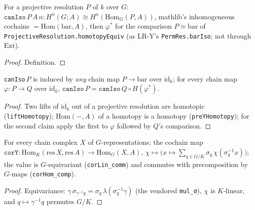 \begin{definition}\label{def:m6-can}
  \leanok
  For a projective resolution $P$ of $k$ over $G$: $\texttt{canIso}\,P\,A\,n\colon H^n(G;A)\cong H^n(\mathrm{Hom}_G(P,A))$, mathlib's
  inhomogeneous cochains $=\mathrm{Hom}(\mathrm{bar},A)$, then $\varphi^*$ for the comparison $P\simeq\mathrm{bar}$ of
  \texttt{ProjectiveResolution.homotopyEquiv} (as LR-Y's \texttt{PermRes.barIso}; not through $\mathrm{Ext}$).
\end{definition}
\begin{proof}
  \leanok
  Definition.
\end{proof}

\begin{lemma}\label{lem:m6-can-lift}
  \leanok
  \texttt{canIso}\,$P$ is induced by \emph{any} chain map $P\to\mathrm{bar}$ over $\mathrm{id}_k$; for every chain map
  $\varphi\colon P\to Q$ over $\mathrm{id}_k$, $\texttt{canIso}\,P=\texttt{canIso}\,Q\circ H(\varphi^*)$.
\end{lemma}
\begin{proof}
  \leanok
  Two lifts of $\mathrm{id}_k$ out of a projective resolution are homotopic (\texttt{liftHomotopy}); $\mathrm{Hom}(-,A)$ of a homotopy
  is a homotopy (\texttt{preYHomotopy}); for the second claim apply the first to $\varphi$ followed by $Q$'s comparison.
\end{proof}

\begin{definition}\label{def:m6-corY}
  \leanok
  For every chain complex $X$ of $G$-representations: the cochain map $\texttt{corY}\colon\mathrm{Hom}_K(\mathrm{res}\,X,\mathrm{res}\,A)\to
  \mathrm{Hom}_G(X,A)$, $\chi\mapsto\bigl(x\mapsto\sum_{q\in G/K}\sigma_q\,\chi(\sigma_q^{-1}x)\bigr)$; the value is $G$-equivariant
  (\texttt{corLin\_comm}) and commutes with precomposition by $G$-maps (\texttt{corHom\_comp}).
\end{definition}
\begin{proof}
  \leanok
  Equivariance: $\gamma\,\sigma_{\gamma^{-1}q}=\sigma_q\,\lambda(\sigma_q^{-1}\gamma)$ (the vendored \texttt{mul\_σ}), $\chi$ is
  $K$-linear, and $q\mapsto\gamma^{-1}q$ permutes $G/K$.
\end{proof}


